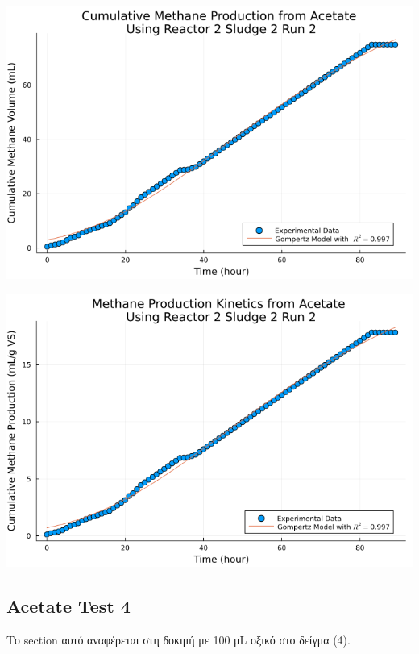\documentclass[11pt]{article}
\begin{document}
\begin{center}
\includegraphics[width=.9\linewidth]{../plots/BMPs/Acetate/methane_kinetics_acet_test_2_s2_2_hour.png}
\end{center}

\begin{center}
\includegraphics[width=.9\linewidth]{../plots/BMPs/Acetate/specific_methane_kinetics_acet_test_2_s2_2_hour.png}
\end{center}

\subsection{Acetate Test 4}
\label{sec:org02ed6ed}
Το section αυτό αναφέρεται στη δοκιμή με 100 μL οξικό στο δείγμα (4).
\end{document}

